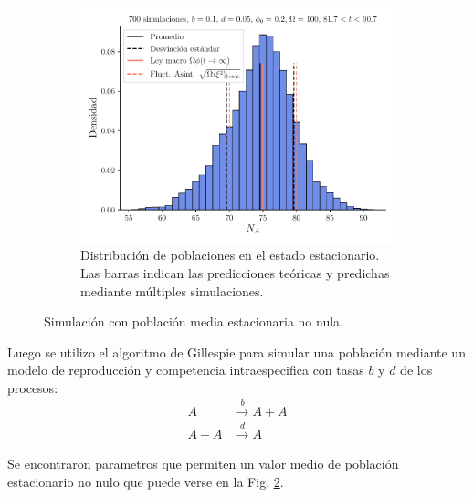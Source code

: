 \documentclass[twocolumn,aps,prl]{revtex4-1}
\begin{document}
\begin{figure}[ht!]
\begin{subfigure}[b]{0.49\linewidth}
      \includegraphics[width = 0.999\textwidth]{figuras/ex03-b.pdf}
      \caption{Distribución de poblaciones en el estado estacionario. Las barras indican las predicciones teóricas y predichas mediante múltiples simulaciones.}
      \label{fig:figuras/ex03-b}
  \end{subfigure}\quad
  \caption{Simulación con población media estacionaria no nula.}
  \label{fig:figuras/ex03-stat}
\end{figure}

Luego se utilizo el algoritmo de Gillespie para simular una población mediante un modelo de reproducción y competencia intraespecifica con tasas $b$ y $d$ de los procesos:
$$
\begin{aligned}
A & \stackrel{b}{\rightarrow} A+A \\
A+A & \stackrel{d}{\rightarrow} A
\end{aligned}
$$

Se encontraron parametros que permiten un valor medio de población estacionario no nulo que puede verse en la Fig. \ref{fig:figuras/ex03-stat}.
\end{document}
